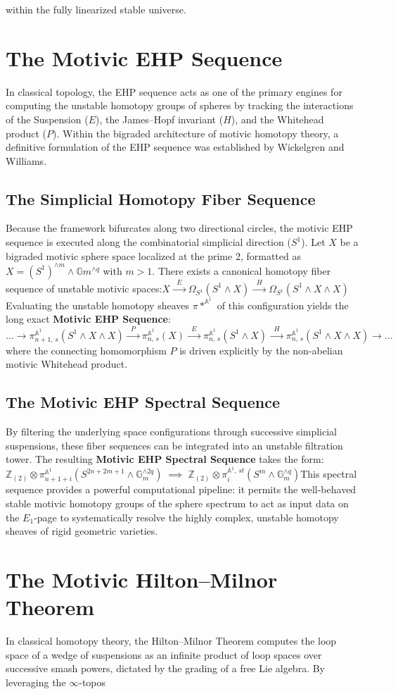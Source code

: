\documentclass[11pt,oneside]{article}
\begin{document}
\begin{enumerate}
within the fully linearized stable universe.\section{The Motivic EHP Sequence}In classical topology, the EHP sequence acts as one of the primary engines for computing the unstable homotopy groups of spheres by tracking the interactions of the Suspension ($E$), the James--Hopf invariant ($H$), and the Whitehead product ($P$). Within the bigraded architecture of motivic homotopy theory, a definitive formulation of the EHP sequence was established by Wickelgren and Williams.\subsection{The Simplicial Homotopy Fiber Sequence}Because the framework bifurcates along two directional circles, the motivic EHP sequence is executed along the combinatorial simplicial direction ($S^1$). Let $X$ be a bigraded motivic sphere space localized at the prime 2, formatted as $X = (S^1)^{\wedge m} \wedge \mathbb{G}m^{\wedge q}$ with $m > 1$. There exists a canonical homotopy fiber sequence of unstable motivic spaces:\(X\xrightarrow{\;\;E\;\;}\Omega _{S^{1}}(S^{1}\land X)\xrightarrow{\;\;H\;\;}\Omega _{S^{1}}(S^{1}\land X\land X)\)Evaluating the unstable homotopy sheaves $\pi*^{\mathbb{A}^1}$ of this configuration yields the long exact \textbf{Motivic EHP Sequence}:\(\dots \rightarrow \pi _{n+1,\,s}^{\mathbb{A}^{1}}(S^{1}\land X\land X)\xrightarrow{\;\;P\;\;}\pi _{n,\,s}^{\mathbb{A}^{1}}(X)\xrightarrow{\;\;E\;\;}\pi _{n,\,s}^{\mathbb{A}^{1}}(S^{1}\land X)\xrightarrow{\;\;H\;\;}\pi _{n,\,s}^{\mathbb{A}^{1}}(S^{1}\land X\land X)\rightarrow \dots \)where the connecting homomorphism $P$ is driven explicitly by the non-abelian motivic Whitehead product.\subsection{The Motivic EHP Spectral Sequence}By filtering the underlying space configurations through successive simplicial suspensions, these fiber sequences can be integrated into an unstable filtration tower. The resulting \textbf{Motivic EHP Spectral Sequence} takes the form:\(\mathbb{Z}_{(2)}\otimes \pi _{n+1+i}^{\mathbb{A}^{1}}\left(S^{2n+2m+1}\land \mathbb{G}_{m}^{\land 2q}\right)\;\implies \;\mathbb{Z}_{(2)}\otimes \pi _{i}^{\mathbb{A}^{1},\,st}\left(S^{m}\land \mathbb{G}_{m}^{\land q}\right)\)This spectral sequence provides a powerful computational pipeline: it permits the well-behaved stable motivic homotopy groups of the sphere spectrum to act as input data on the $E_1$-page to systematically resolve the highly complex, unstable homotopy sheaves of rigid geometric varieties.\section{The Motivic Hilton--Milnor Theorem}In classical homotopy theory, the Hilton--Milnor Theorem computes the loop space of a wedge of suspensions as an infinite product of loop spaces over successive smash powers, dictated by the grading of a free Lie algebra. By leveraging the $\infty$-topos 
\end{enumerate}
\end{document}
